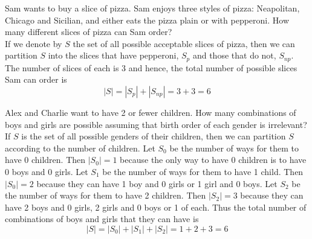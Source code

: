 \documentclass[handout]{ximera}
\begin{document}
\begin{example}[example 3]
Sam wants to buy a slice of pizza.  
Sam enjoys three styles of pizza: Neapolitan, Chicago and Sicilian, 
and either eats the pizza plain or with pepperoni.  
How many different slices of pizza can Sam order?\\
If we denote by $S$ the set of all possible acceptable slices of pizza, 
then we can partition $S$ into the slices that have pepperoni, $S_p$ and 
those that do not, $S_{np}$. The number of slices of each is 3 and 
hence, the total number of possible slices Sam can order is
\[
|S| = |S_p| + |S_{np}| = 3+3 =6
\]
\end{example}

\begin{example}[example 4]
Alex and Charlie want to have 2 or fewer children.  
How many combinations of boys and girls are possible assuming 
that birth order of each gender is irrelevant?\\

If $S$ is the set of all possible genders of their children, then we can partition $S$ according to the number of children. Let $S_0$ be the number of ways for them to have 0 children. Then $|S_0| = 1$ because the only way to have 0 children is to have 0 boys and 0 girls. Let $S_1$ be the number of ways for them to have 1 child. Then $|S_0| = 2$ because they can have 1 boy and 0 girls or 1 girl and 0 boys.
 Let $S_2$ be the number of ways for them to have 2 children. Then $|S_2| = 3$ because they
 can have 2 boys and 0 girls, 2 girls and 0 boys or 1 of each.
 Thus the total number of combinations of boys and girls that they can have is
 \[
 |S| = |S_0|+|S_1|+|S_2|= 1 + 2+3 = 6
 \]
 \end{example}
 
\end{document}
